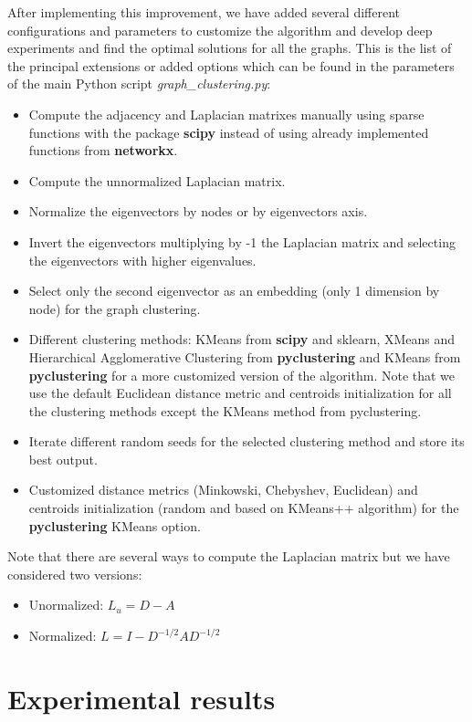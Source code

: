 \documentclass[11pt]{extarticle}
\begin{document}
After implementing this improvement, we have added several different configurations and parameters to customize the algorithm and develop deep experiments and find the optimal solutions for all the graphs. This is the list of the principal extensions or added options which can be found in the parameters of the main Python script \textit{graph\_clustering.py}:
\begin{itemize}
    \item Compute the adjacency and Laplacian matrixes manually using sparse functions with the package \textbf{scipy} instead of using already implemented functions from \textbf{networkx}.
    \item Compute the unnormalized Laplacian matrix.
    \item Normalize the eigenvectors by nodes or by eigenvectors axis.
    \item Invert the eigenvectors multiplying by -1 the Laplacian matrix and selecting the eigenvectors with higher eigenvalues.
    \item Select only the second eigenvector as an embedding (only 1 dimension by node) for the graph clustering.
    \item Different clustering methods: KMeans from \textbf{scipy} and {sklearn}, XMeans and Hierarchical Agglomerative Clustering from \textbf{pyclustering} and KMeans from \textbf{pyclustering} for a more customized version of the algorithm. Note that we use the default Euclidean distance metric and centroids initialization for all the clustering methods except the KMeans method from pyclustering.
    \item Iterate different random seeds for the selected clustering method and store its best output.
    \item Customized distance metrics (Minkowski, Chebyshev, Euclidean) and centroids initialization (random and based on KMeans++ algorithm) for the \textbf{pyclustering} KMeans option.
\end{itemize}

Note that there are several ways to compute the Laplacian matrix but we have considered two versions:
\begin{itemize}
    \item Unormalized: $L_{u}=D-A$
    \item Normalized: $L=I-D^{-1/2} A D^{-1/2}$
\end{itemize}

\section{Experimental results}
\end{document}
